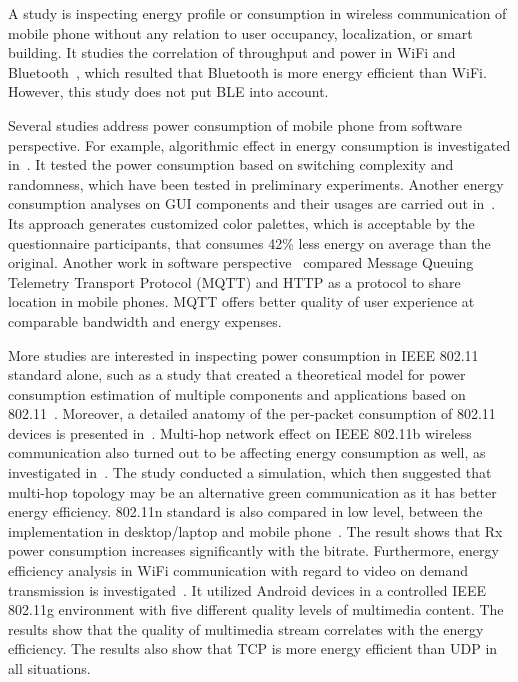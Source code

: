 \documentclass[journal]{vgtc}                %
\begin{document}
A study is inspecting energy profile or consumption in wireless communication of mobile phone without any relation to user occupancy, localization, or smart building. It studies the correlation of throughput and power in WiFi and Bluetooth~\cite{Friedman2013}, which resulted that Bluetooth is more energy efficient than WiFi. However, this study does not put BLE into account.

Several studies address power consumption of mobile phone from software perspective. For example, algorithmic effect in energy consumption is investigated in~\cite{Jain2005}. It tested the power consumption based on switching complexity and randomness, which have been tested in preliminary experiments. Another energy consumption analyses on GUI components and their usages are carried out in~\cite{Bernal-cardenas2015}. Its approach generates customized color palettes, which is acceptable by the questionnaire participants, that consumes 42\% less energy on average than the original. Another work in software perspective~\cite{Vergara2013} compared Message Queuing Telemetry Transport Protocol (MQTT) and HTTP as a protocol to share location in mobile phones. MQTT offers better quality of user experience at comparable bandwidth and energy expenses.

More studies are interested in inspecting power consumption in IEEE 802.11 standard alone, such as a study that created a theoretical model for power consumption estimation of multiple components and applications based on 802.11~\cite{Marcu2011}. Moreover, a detailed anatomy of the per-packet consumption of 802.11 devices is presented in~\cite{Garcia-Saavedra2012}. Multi-hop network effect on IEEE 802.11b wireless communication also turned out to be affecting energy consumption as well, as investigated in~\cite{Andriani2013}. The study conducted a simulation, which then suggested that multi-hop topology may be an alternative green communication as it has better energy efficiency. 802.11n standard is also compared in low level, between the implementation in desktop/laptop and mobile phone~\cite{Warty2012}. The result shows that Rx power consumption increases significantly with the bitrate. Furthermore, energy efficiency analysis in WiFi communication with regard to video on demand transmission is investigated~\cite{Trestian2012}. It utilized Android devices in a controlled IEEE 802.11g environment with five different quality levels of multimedia content. The results show that the quality of multimedia stream correlates with the energy efficiency. The results also show that TCP is more energy efficient than UDP in all situations.
\end{document}
